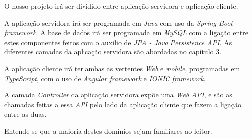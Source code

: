 O nosso projeto irá ser dividido entre aplicação servidora e aplicação cliente.

A aplicação servidora irá ser programada em \emph{Java} com uso da \emph{Spring Boot framework}. A base de dados irá ser programada em \emph{MySQL} com a ligação entre estes componentes feitos com o auxilio de \emph{JPA - Java Persistence API}. As diferentes camadas da aplicação servidora são abordadas no capítulo 3.

A aplicação cliente irá ter ambas as vertentes \emph{Web} e \emph{mobile}, programadas em \emph{TypeScript}, com o uso de \emph{Angular framework} e \emph{IONIC framework}.

A camada \textit{Controller} da aplicação servidora expõe uma \textit{Web API}, e são as chamadas feitas a essa \textit{API} pelo lado da aplicação cliente que fazem a ligação entre as duas.

Entende-se que a maioria destes domínios sejam familiares ao leitor.

